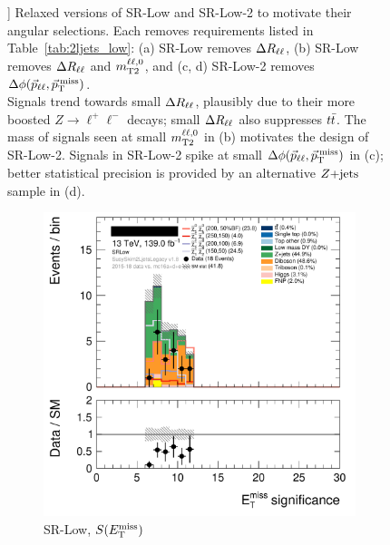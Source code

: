 \begin{figure}[tp]
]{%
Relaxed versions of SR-Low and SR-Low-2 to motivate their angular selections.
Each removes requirements listed in Table~\ref{tab:2ljets_low}:
(a) SR-Low removes $\Delta R_{\ell\ell}$,
(b) SR-Low removes $\Delta R_{\ell\ell}$ and $m_\mathrm{T2}^{\ell\ell,0}$,
and
(c, d) SR-Low-2 removes $\Delta\phi(\vec p_{\ell\ell}, \vec p_\mathrm{T}^\mathrm{\:miss})$.
\\[0.5em]
Signals trend towards small $\Delta R_{\ell\ell}$, plausibly due to their more boosted
$Z\rightarrow \ell^+\ell^-$ decays; small $\Delta R_{\ell\ell}$ also suppresses $t\bar t$.
The mass of signals seen at small $m_\mathrm{T2}^{\ell\ell,0}$ in (b) motivates the design of
SR-Low-2.
Signals in SR-Low-2 spike at small $\Delta\phi(\vec p_{\ell\ell}, \vec p_\mathrm{T}^\mathrm{\:miss})$ in (c); better statistical
precision is provided by an alternative $Z\mathrm{+jets}$ sample in (d).
}
\label{fig:2ljets_low_minus}
\end{figure}

\begin{figure}[tp]
\centering
\begin{subfigure}{0.48\textwidth}
\centering
\includegraphics[width=\textwidth]{figures/2ljets_def_met_Sign_SRLow.png}
\caption{SR-Low, $S(E_\mathrm{T}^\mathrm{miss})$}
\end{subfigure}
\hfill
\begin{subfigure}{0.48\textwidth}
\centering

\end{subfigure}
\end{figure}
